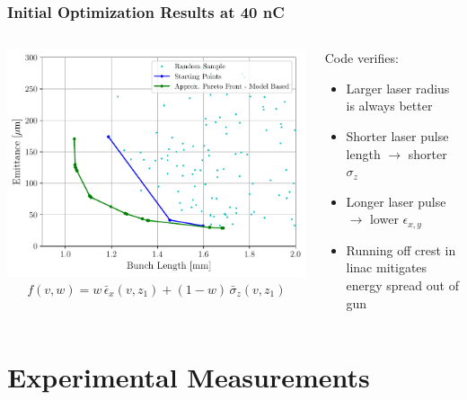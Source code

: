 \documentclass[professionalfonts,t]{beamer}
\begin{document}
\begin{frame}
	\frametitle{Initial Optimization Results at 40 nC}
\begin{columns}[T] %
	\begin{column}{.56\textwidth}
		\includegraphics[width=1.0\linewidth, right]{../images/pareto_emittance_vs_zrms}
	    \begin{gather*}
	    f(v,w) = w \,\bar{\epsilon}_x(v,z_1) + (1-w)\, \bar{\sigma}_z(v,z_1)
	    \end{gather*}
	\end{column}%
	\hfill%
	\begin{column}{.44\textwidth}
		Code verifies:
		\begin{itemize}
		\item Larger laser radius is always better
		\item Shorter laser pulse length $\rightarrow$ shorter $\sigma_z$
		\item Longer laser pulse $\rightarrow$ lower $\epsilon_{x,y}$
		\item Running off crest in linac mitigates energy spread out of gun
	    \end{itemize}	
	\end{column}%
\end{columns}
\end{frame}
\section{Experimental Measurements}
\end{document}

